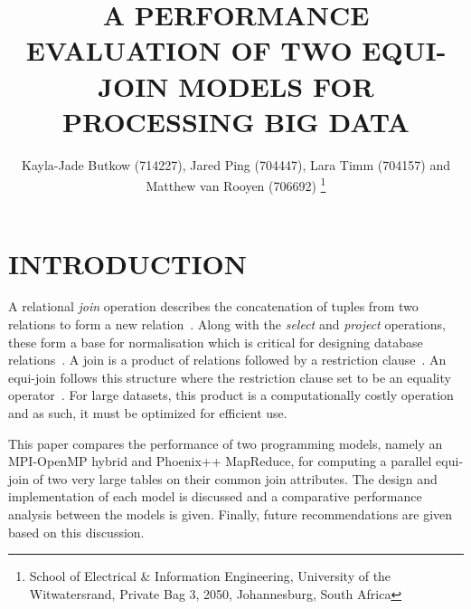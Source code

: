 \documentclass[12pt,twocolumn]{witseiepaper}
\begin{document}

\title{A PERFORMANCE EVALUATION OF TWO EQUI-JOIN MODELS FOR PROCESSING BIG DATA}

\author{Kayla-Jade Butkow (714227), Jared Ping (704447), Lara Timm (704157) and Matthew van Rooyen (706692)
	\thanks{School of Electrical \& Information Engineering, University of the
		Witwatersrand, Private Bag 3, 2050, Johannesburg, South Africa}
}

%


\maketitle
\thispagestyle{empty}
\pagestyle{plain}
\setcounter{page}{1}

\section{INTRODUCTION}

A relational \textit{join} operation describes the concatenation of tuples from two relations to form a new relation~\cite{stanczyk2001theory}. Along with the \textit{select} and \textit{project} operations, these form a base for normalisation which is critical for designing database relations~\cite{stanczyk2001theory}. A join is a product of relations followed by a restriction clause~\cite{stanczyk2001theory}. An equi-join follows this structure where the restriction clause set to be an equality operator~\cite{stanczyk2001theory}. For large datasets, this product is a computationally costly operation and as such, it must be optimized for efficient use.

This paper compares the performance of two programming models, namely an MPI-OpenMP hybrid and Phoenix++ MapReduce, for computing a parallel equi-join of two very large tables on their common join attributes. The design and implementation of each model is discussed and a comparative performance analysis between the models is given. Finally, future recommendations are given based on this discussion.
\end{document}
